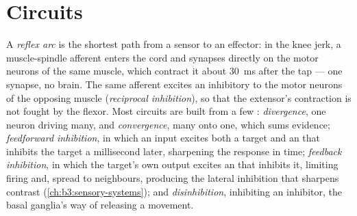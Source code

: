 \section{Circuits}

\begin{definition}\label{def:b3:nervous-systems:circuits}
A \emph{reflex arc} is the shortest path from a sensor to an effector:
in the knee jerk, a muscle-spindle afferent enters the cord and
synapses directly on the motor neurons of the same muscle, which
contract it about \qty{30}{ms} after the tap --- one synapse, no brain.
The same afferent excites an inhibitory  to the motor
neurons of the opposing muscle (\emph{reciprocal inhibition}), so that
the extensor's contraction is not fought by the flexor. Most circuits
are built from a few : \emph{divergence}, one neuron driving
many, and \emph{convergence}, many onto one, which sums evidence;
\emph{feedforward inhibition}, in which an input excites both a target
and an  that inhibits the target a millisecond later,
sharpening the response in time; \emph{feedback inhibition}, in which
the target's own output excites an  that inhibits it,
limiting firing and, spread to neighbours, producing the lateral
inhibition that sharpens contrast (\cref{ch:b3:sensory-systems}); and
\emph{disinhibition}, inhibiting an inhibitor, the basal ganglia's way
of releasing a movement.
\end{definition}

